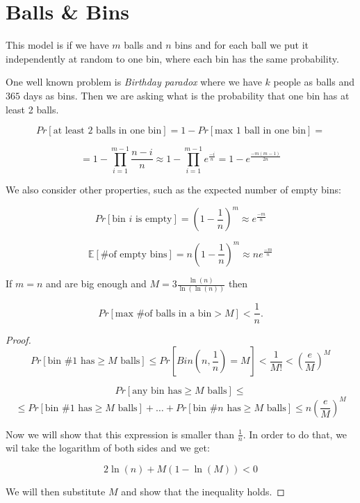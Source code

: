 \chapter{Balls \& Bins}

This model is if we have $m$ balls and $n$ bins and for each ball we put it independently at random to one bin, where each bin has the same probability.

One well known problem is \textit{Birthday paradox} where we have $k$ people as balls and $365$ days as bins. Then we are asking what is the probability that one bin has at least 2 balls.

$$
Pr[\text{at least 2 balls in one bin}] = 1 - Pr[\text{max 1 ball in one bin}] =
$$

$$
= 1 - \prod_{i=1}^{m-1} \frac{n-i}{n} \approx 1 - \prod_{i=1}^{m-1} e^{\frac{-i}{n}} = 1 - e^{\frac{-m(m-1)}{2n}}
$$

We also consider other properties, such as the expected number of empty bins:

$$
Pr[\text{bin } i \text{ is empty}] = \left(1 - \frac{1}{n}\right)^{m} \approx e^{\frac{-m}{n}}
$$

$$
\mathbb{E}[ \text{\# of empty bins}] = n \left(1- \frac{1}{n}\right)^{m} \approx n e^{\frac{-m}{n}}
$$

\begin{thm}
	If $m=n$ and are big enough and $M = 3 \frac{\ln(n)}{\ln\left(\ln\left(n\right)\right)}$ then
	
	$$
	Pr[\text{max \# of balls in a bin} > M] < \frac{1}{n}.
	$$
\end{thm}

\begin{proof}
	
	$$
	Pr[\text{bin } \#1 \text{ has} \geq M \text{ balls} ]  \leq Pr\left[Bin\left(n, \frac{1}{n}\right) = M\right] < \frac{1}{M!} < \left(\frac{e}{M}\right)^M
	$$
	
	$$
	Pr[\text{any bin has} \geq M \text{ balls} ] \leq
	$$
	$$
	\leq Pr[\text{bin } \#1 \text{ has} \geq M \text{ balls} ] + \dots + Pr[\text{bin } \#n \text{ has} \geq M \text{ balls} ] \leq n \left(\frac{e}{M}\right)^M
	$$
	
	Now we will show that this expression is smaller than $\frac{1}{n}$. In order to do that, we wil take the logarithm of both sides and we get:
	
	$$
	2\ln(n) + M\left(1-\ln\left(M\right)\right) < 0
	$$
	
	We will then substitute $M$ and show that the inequality holds.
\end{proof}


